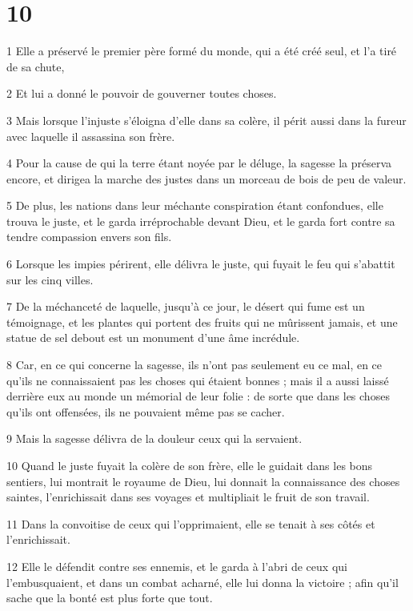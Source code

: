 \chapter{10}

\par 1 Elle a préservé le premier père formé du monde, qui a été créé seul, et l'a tiré de sa chute,
\par 2 Et lui a donné le pouvoir de gouverner toutes choses.
\par 3 Mais lorsque l'injuste s'éloigna d'elle dans sa colère, il périt aussi dans la fureur avec laquelle il assassina son frère.
\par 4 Pour la cause de qui la terre étant noyée par le déluge, la sagesse la préserva encore, et dirigea la marche des justes dans un morceau de bois de peu de valeur.
\par 5 De plus, les nations dans leur méchante conspiration étant confondues, elle trouva le juste, et le garda irréprochable devant Dieu, et le garda fort contre sa tendre compassion envers son fils.
\par 6 Lorsque les impies périrent, elle délivra le juste, qui fuyait le feu qui s'abattit sur les cinq villes.
\par 7 De la méchanceté de laquelle, jusqu'à ce jour, le désert qui fume est un témoignage, et les plantes qui portent des fruits qui ne mûrissent jamais, et une statue de sel debout est un monument d'une âme incrédule.
\par 8 Car, en ce qui concerne la sagesse, ils n'ont pas seulement eu ce mal, en ce qu'ils ne connaissaient pas les choses qui étaient bonnes ; mais il a aussi laissé derrière eux au monde un mémorial de leur folie : de sorte que dans les choses qu'ils ont offensées, ils ne pouvaient même pas se cacher.
\par 9 Mais la sagesse délivra de la douleur ceux qui la servaient.
\par 10 Quand le juste fuyait la colère de son frère, elle le guidait dans les bons sentiers, lui montrait le royaume de Dieu, lui donnait la connaissance des choses saintes, l'enrichissait dans ses voyages et multipliait le fruit de son travail.
\par 11 Dans la convoitise de ceux qui l'opprimaient, elle se tenait à ses côtés et l'enrichissait.
\par 12 Elle le défendit contre ses ennemis, et le garda à l'abri de ceux qui l'embusquaient, et dans un combat acharné, elle lui donna la victoire ; afin qu'il sache que la bonté est plus forte que tout.
